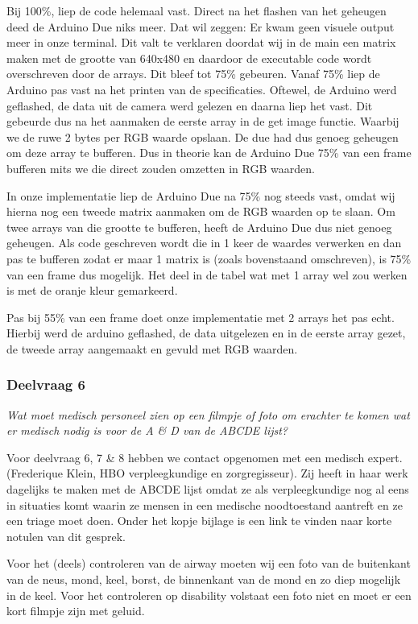\documentclass{article}
\begin{document}
Bij 100\%, liep de code helemaal vast. Direct na het flashen van het geheugen deed de Arduino Due niks meer. Dat wil zeggen: Er kwam geen visuele output meer in onze terminal. Dit valt te verklaren doordat wij in de main een matrix maken met de grootte van 640x480 en daardoor de executable code wordt overschreven door de arrays. 
Dit bleef tot 75\% gebeuren. Vanaf 75\% liep de Arduino pas vast na het printen van de specificaties. Oftewel, de Arduino werd geflashed, de data uit de camera werd gelezen en daarna liep het vast. Dit gebeurde dus na het aanmaken de eerste array in de get image functie. Waarbij we de ruwe 2 bytes per RGB waarde opslaan. De due had dus genoeg geheugen om deze array te bufferen. Dus in theorie kan de Arduino Due 75\% van een frame bufferen mits we die direct zouden omzetten in RGB waarden.

In onze implementatie liep de Arduino Due na 75\% nog steeds vast, omdat wij hierna nog een tweede matrix aanmaken om de RGB waarden op te slaan. Om twee arrays van die grootte te bufferen, heeft de Arduino Due dus niet genoeg geheugen. Als code geschreven wordt die in 1 keer de waardes verwerken en dan pas te bufferen zodat er maar 1 matrix is (zoals bovenstaand omschreven), is 75\% van een frame dus mogelijk. Het deel in de tabel wat met 1 array wel zou werken is met de oranje kleur gemarkeerd.

Pas bij 55\% van een frame doet onze implementatie met 2 arrays het pas echt. Hierbij werd de arduino geflashed, de data uitgelezen en in de eerste array gezet, de tweede array aangemaakt en gevuld met RGB waarden.

\subsubsection{Deelvraag 6}
\textit{Wat moet medisch personeel zien op een filmpje of foto om erachter te komen wat er medisch nodig is voor de A \& D van de ABCDE lijst? }

Voor deelvraag 6, 7 \& 8 hebben we contact opgenomen met een medisch expert. (Frederique Klein, HBO verpleegkundige en zorgregisseur). Zij heeft in haar werk dagelijks te maken met de ABCDE lijst omdat ze als verpleegkundige nog al eens in situaties komt waarin ze mensen in een medische noodtoestand aantreft en ze een triage moet doen. Onder het kopje bijlage is een link te vinden naar korte notulen van dit gesprek. 

Voor het (deels) controleren van de airway moeten wij een foto van de buitenkant van de neus, mond, keel, borst, de binnenkant van de mond en zo diep mogelijk in de keel. 
Voor het controleren op disability volstaat een foto niet en moet er een kort filmpje zijn met geluid.
\end{document}
